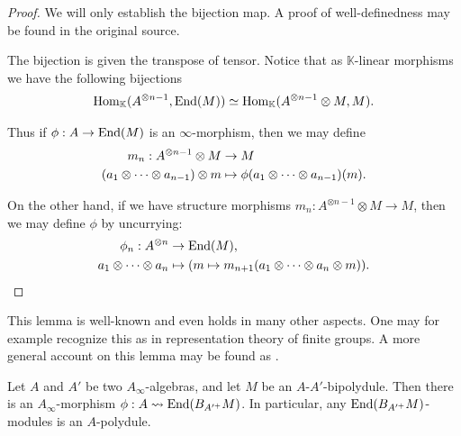 \documentclass[../thesis.tex]{subfiles}
\begin{document}
            \begin{proof}
                We will only establish the bijection map. A proof of well-definedness may be found in the original source.
                
                The bijection is given the transpose of tensor. Notice that as $\mathbb{K}$-linear morphisms we have the following bijections
                \begin{align*}
                    \tt{Hom}_\mathbb{K}(A^{\otimes n-1}, \tt{End}(M)) \simeq \tt{Hom}_{\mathbb{K}}(A^{\otimes n-1}\otimes M, M)\tt{.}
                \end{align*}

                Thus if $\phi : A \rightarrow \tt{End}(M)$ is an $\infty$-morphism, then we may define
                \begin{align*}
                    m_n : A^{\otimes n-1} \otimes M & \rightarrow M \\
                    (a_1 \otimes \cdots \otimes a_{n-1})\otimes m & \mapsto \phi(a_1\otimes\cdots\otimes a_{n-1})(m)\tt{.}
                \end{align*}

                On the other hand, if we have structure morphisms $m_n : A^{\otimes n-1}\otimes M \rightarrow M$, then we may define $\phi$ by uncurrying:
                \begin{align*}
                    \phi_n : A^{\otimes n} & \rightarrow \tt{End}(M)\tt{,} \\
                    a_1 \otimes \cdots \otimes a_n & \mapsto (m \mapsto m_{n+1}(a_1 \otimes \cdots \otimes a_n \otimes m))\tt{.}
                \end{align*}
            \end{proof}

            \begin{remark}
                This lemma is well-known and even holds in many other aspects. One may for example recognize this as in representation theory of finite groups. A more general account on this lemma may be found as \cite[proposition 5.2.2.][139]{Loday12}.
            \end{remark}

            \begin{corollary}
                Let $A$ and $A'$ be two $A_\infty$-algebras, and let $M$ be an $A$-$A'$-bipolydule. Then there is an $A_\infty$-morphism $\phi : A \rightsquigarrow \tt{End}(B_{A'^+}M)$. In particular, any $\tt{End}(B_{A'^+}M)$-modules is an $A$-polydule.
            \end{corollary}
\end{document}
